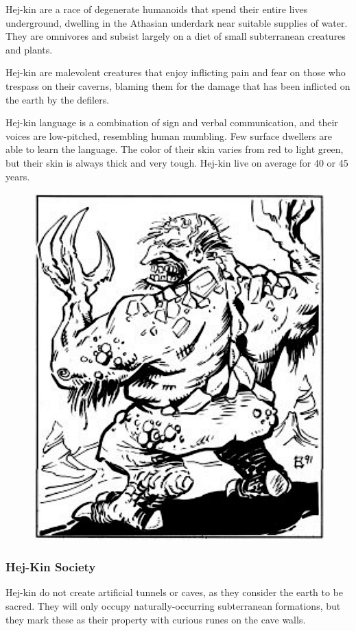 Hej-kin are a race of degenerate humanoids that spend their entire lives underground, dwelling in the Athasian underdark near suitable supplies of water. They are omnivores and subsist largely on a diet of small subterranean creatures and plants.

Hej-kin are malevolent creatures that enjoy inflicting pain and fear on those who trespass on their caverns, blaming them for the damage that has been inflicted on the earth by the defilers.

Hej-kin language is a combination of sign and verbal communication, and their voices are low-pitched, resembling human mumbling. Few surface dwellers are able to learn the language. The color of their skin varies from red to light green, but their skin is always thick and very tough. Hej-kin live on average for 40 or 45 years.

\begin{figure}[t!]
\centering
\includegraphics[width=\columnwidth]{images/hej-kin.png}
\WOTC
\end{figure}

\subsubsection{Hej-Kin Society}
Hej-kin do not create artificial tunnels or caves, as they consider the earth to be sacred. They will only occupy naturally-occurring subterranean formations, but they mark these as their property with curious runes on the cave walls.

